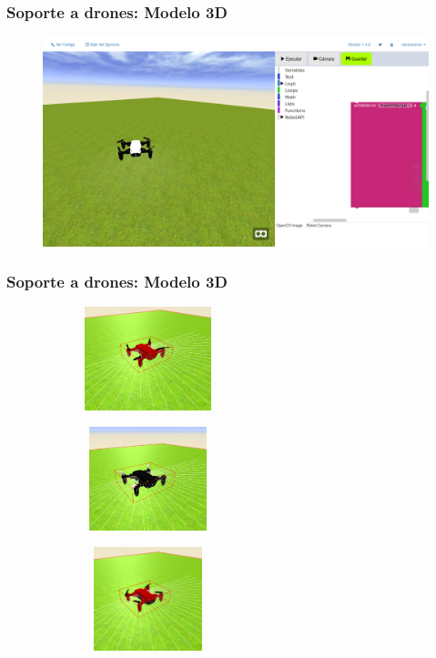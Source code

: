 \documentclass[xcolor={table}]{beamer}
\begin{document}
    	\begin{frame}
			\frametitle{Soporte a drones: Modelo 3D}
           \begin{figure}[H]
            \centering
            \includegraphics[scale=0.2]{img/websimDrone.png}
           \label{fig:escenarioDrone}
            \end{figure}
    	\end{frame}
    	
    	   \begin{frame}
			\frametitle{Soporte a drones: Modelo 3D}
          \begin{figure}[H]
        \centering
        \begin{subfigure}{\textwidth}
         \includegraphics[width=4cm, height=3cm]{img/red_drone.png}
 \label{fig:drone_rojo}
        \end{subfigure}
        \begin{subfigure}{\textwidth}
         \includegraphics[width=4cm, height=3cm]{img/black_drone.png}
   \label{fig:drone_negro}
        \end{subfigure}
        \begin{subfigure}{\textwidth}
         \includegraphics[width=4cm, height=3cm]{img/red_blackdrone.png}
   \label{fig:drone_negrorojo}
        \end{subfigure}
    \end{figure}
    	\end{frame}
		   
\end{document}
